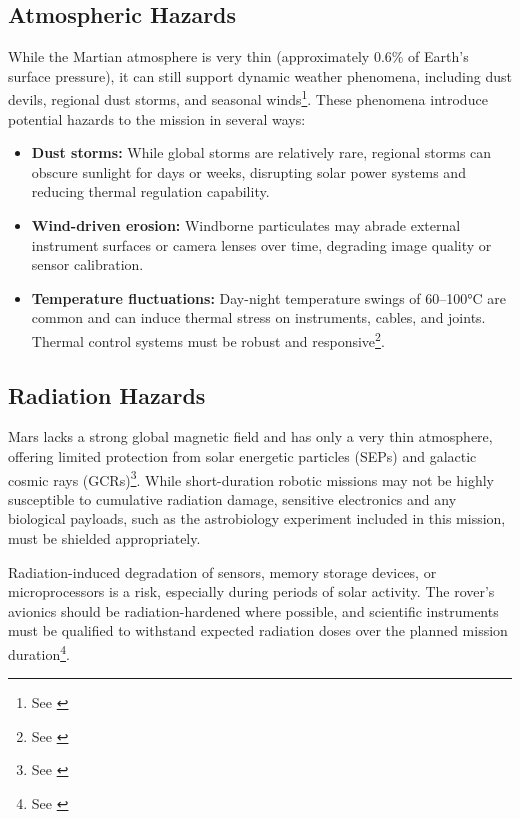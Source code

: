 \subsection*{Atmospheric Hazards}

While the Martian atmosphere is very thin (approximately 0.6\% of Earth’s surface pressure), it can still support dynamic weather phenomena, including dust devils, regional dust storms, and seasonal winds\footnote{See \cite{asu_2019_atmosphere}}. These phenomena introduce potential hazards to the mission in several ways:

\begin{itemize}
    \item \textbf{Dust storms:} While global storms are relatively rare, regional storms can obscure sunlight for days or weeks, disrupting solar power systems and reducing thermal regulation capability.
    \item \textbf{Wind-driven erosion:} Windborne particulates may abrade external instrument surfaces or camera lenses over time, degrading image quality or sensor calibration.
    \item \textbf{Temperature fluctuations:} Day-night temperature swings of 60--100°C are common and can induce thermal stress on instruments, cables, and joints. Thermal control systems must be robust and responsive\footnote{See \cite{nasa_2019_env_hazards}}.
\end{itemize}

\subsection*{Radiation Hazards}

Mars lacks a strong global magnetic field and has only a very thin atmosphere, offering limited protection from solar energetic particles (SEPs) and galactic cosmic rays (GCRs)\footnote{See \cite{nrc_2002_safe}}. While short-duration robotic missions may not be highly susceptible to cumulative radiation damage, sensitive electronics and any biological payloads, such as the astrobiology experiment included in this mission, must be shielded appropriately.

Radiation-induced degradation of sensors, memory storage devices, or microprocessors is a risk, especially during periods of solar activity. The rover's avionics should be radiation-hardened where possible, and scientific instruments must be qualified to withstand expected radiation doses over the planned mission duration\footnote{See \cite{nasa_2019_env_hazards}}.

